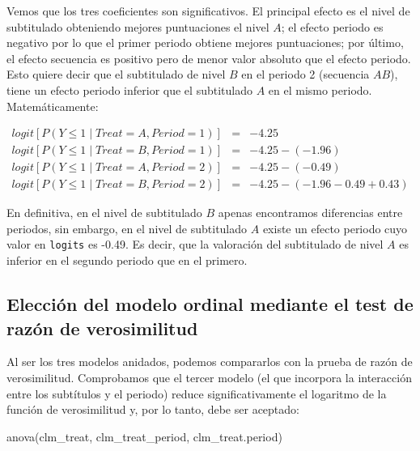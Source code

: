 \documentclass[
  12pt,
  a4paper,
  extrafontsizes,
  onecolumn,
  openright]{memoir}
\newenvironment{Shaded}{\begin{snugshade}}{\end{snugshade}}
\newcommand{\FunctionTok}[1]{\textcolor[rgb]{0.28,0.35,0.67}{#1}}
\newcommand{\NormalTok}[1]{\textcolor[rgb]{0.00,0.23,0.31}{#1}}
\begin{document}
\normalsize

Vemos que los tres coeficientes son significativos. El principal efecto
es el nivel de subtitulado obteniendo mejores puntuaciones el nivel
\(A\); el efecto periodo es negativo por lo que el primer periodo
obtiene mejores puntuaciones; por último, el efecto secuencia es
positivo pero de menor valor absoluto que el efecto periodo. Esto quiere
decir que el subtitulado de nivel \(B\) en el periodo 2 (secuencia
\(AB\)), tiene un efecto periodo inferior que el subtitulado \(A\) en el
mismo periodo. Matemáticamente:

\[
\begin{aligned}
logit [P(Y \le 1 \mid Treat = A, Period = 1)] & = & -4.25 \\
logit [P(Y \le 1 \mid Treat = B, Period = 1)] & = & -4.25 - (-1.96) \\
logit [P(Y \le 1 \mid Treat = A, Period = 2)] & = & -4.25 - (-0.49) \\
logit [P(Y \le 1 \mid Treat = B, Period = 2)] & = & -4.25 -(-1.96 -0.49 + 0.43)
\end{aligned}
\]

En definitiva, en el nivel de subtitulado \(B\) apenas encontramos
diferencias entre periodos, sin embargo, en el nivel de subtitulado
\(A\) existe un efecto periodo cuyo valor en \texttt{logits} es -0.49.
Es decir, que la valoración del subtitulado de nivel \(A\) es inferior
en el segundo periodo que en el primero.

\hypertarget{elecciuxf3n-del-modelo-ordinal-mediante-el-test-de-razuxf3n-de-verosimilitud}{%
\subsection{Elección del modelo ordinal mediante el test de razón de
verosimilitud}\label{elecciuxf3n-del-modelo-ordinal-mediante-el-test-de-razuxf3n-de-verosimilitud}}

Al ser los tres modelos anidados, podemos compararlos con la prueba de
razón de verosimilitud. Comprobamos que el tercer modelo (el que
incorpora la interacción entre los subtítulos y el periodo) reduce
significativamente el logaritmo de la función de verosimilitud y, por lo
tanto, debe ser aceptado:

\scriptsize

\begin{Shaded}
\begin{Highlighting}[]
\FunctionTok{anova}\NormalTok{(clm\_treat, clm\_treat\_period, clm\_treat.period)}
\end{Highlighting}
\end{Shaded}
\end{document}
